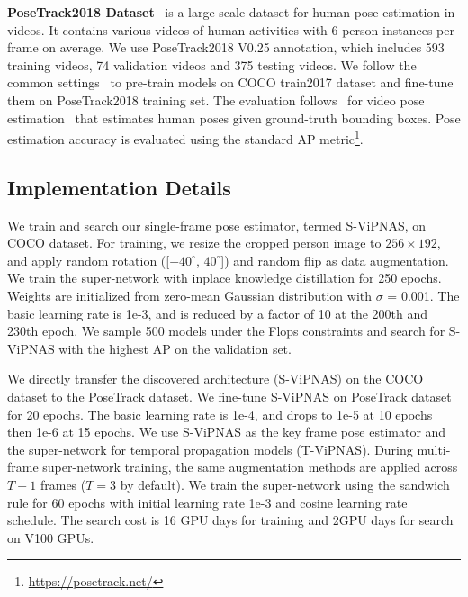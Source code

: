 \documentclass[final]{cvpr}
\begin{document}
\textbf{PoseTrack2018 Dataset}~\cite{andriluka2018posetrack} is a large-scale dataset for human pose estimation in videos. It contains various videos of human activities with 6 person instances per frame on average. We use PoseTrack2018 V0.25 annotation, which includes 593 training videos, 74 validation videos and 375 testing videos. We follow the common settings~\cite{ning2019lighttrack,sun2019deep,xiao2018simple} to pre-train models on COCO train2017 dataset and fine-tune them on PoseTrack2018 training set. The evaluation follows~\cite{lihh2019temporal,liwt2019temporal,luo2018lstm,nie2019dynamic} for video pose estimation~\cite{jhuang2013towards,zhang2013actemes} that estimates human poses given ground-truth bounding boxes. Pose estimation accuracy is evaluated
using the standard AP metric\footnote{\url{https://posetrack.net/}}.

\subsection{Implementation Details}

We train and search our single-frame pose estimator, termed S-ViPNAS, on COCO dataset. 
For training, we resize the cropped person image to $256 \times 192$, and apply random rotation ([$-40 ^{\circ}$, $40 ^{\circ}$]) and random flip as data augmentation. We train the super-network with inplace knowledge distillation for 250 epochs. Weights are initialized from zero-mean Gaussian distribution with $\sigma$ = 0.001. The basic learning rate is 1e-3, and is reduced by a factor of 10 at the 200th and 230th epoch. We sample 500 models under the Flops constraints and search for S-ViPNAS with the highest AP on the validation set. 


We directly transfer the discovered architecture (S-ViPNAS) on the COCO dataset to the PoseTrack dataset. We fine-tune S-ViPNAS on PoseTrack dataset for 20 epochs. The basic learning rate is 1e-4, and drops to 1e-5 at 10 epochs then 1e-6 at 15 epochs. We use S-ViPNAS as the key frame pose estimator and the super-network for temporal propagation models (T-ViPNAS). 
During multi-frame super-network training, the same augmentation methods are applied across $T+1$ frames ($T = 3$ by default). We train the super-network using the sandwich rule for 60 epochs with initial learning rate 1e-3 and cosine learning rate schedule. The search cost is 16 GPU days for training and 2GPU days for search on V100 GPUs.
\end{document}
